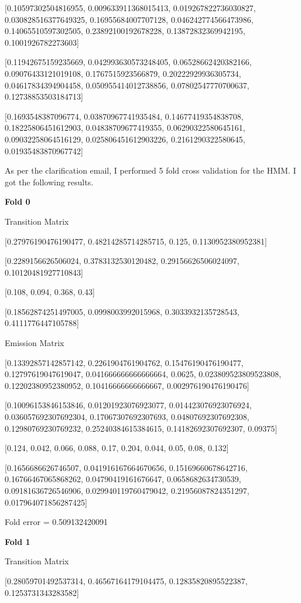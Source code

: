 \documentclass{article}
\begin{document}
[0.10597302504816955, 0.009633911368015413, 0.019267822736030827, 0.030828516377649325, 0.16955684007707128, 0.046242774566473986, 0.14065510597302505, 0.23892100192678228, 0.13872832369942195, 0.1001926782273603]

[0.11942675159235669, 0.042993630573248405, 0.06528662420382166, 0.09076433121019108, 0.1767515923566879, 0.20222929936305734, 0.04617834394904458, 0.050955414012738856, 0.07802547770700637, 0.12738853503184713]

[0.1693548387096774, 0.03870967741935484, 0.14677419354838708, 0.18225806451612903, 0.04838709677419355, 0.06290322580645161, 0.09032258064516129, 0.025806451612903226, 0.2161290322580645, 0.01935483870967742]

As per the clarification email, I performed 5 fold cross validation for the HMM. I
got the following results.

\textbf{Fold 0}

Transition Matrix

[0.27976190476190477, 0.48214285714285715, 0.125, 0.1130952380952381]

[0.2289156626506024, 0.3783132530120482, 0.29156626506024097, 0.10120481927710843]

[0.108, 0.094, 0.368, 0.43]

[0.18562874251497005, 0.0998003992015968, 0.3033932135728543, 0.4111776447105788]

Emission Matrix

[0.13392857142857142, 0.2261904761904762, 0.15476190476190477, 0.12797619047619047, 0.041666666666666664, 0.0625, 0.023809523809523808, 0.12202380952380952, 0.10416666666666667, 0.002976190476190476]

[0.10096153846153846, 0.01201923076923077, 0.014423076923076924, 0.036057692307692304, 0.17067307692307693, 0.04807692307692308, 0.12980769230769232, 0.25240384615384615, 0.14182692307692307, 0.09375]

[0.124, 0.042, 0.066, 0.088, 0.17, 0.204, 0.044, 0.05, 0.08, 0.132]

[0.1656686626746507, 0.041916167664670656, 0.15169660678642716, 0.16766467065868262, 0.04790419161676647, 0.0658682634730539, 0.09181636726546906, 0.029940119760479042, 0.21956087824351297, 0.017964071856287425]

Fold error = 0.509132420091

\textbf{Fold 1}

Transition Matrix

[0.28059701492537314, 0.46567164179104475, 0.12835820895522387, 0.1253731343283582]
\end{document}
